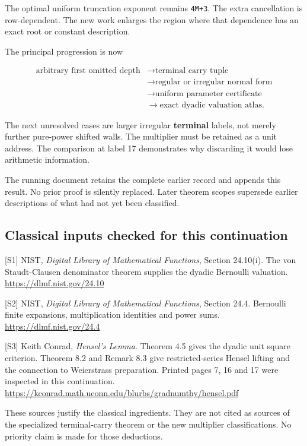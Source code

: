 \documentclass[11pt,letterpaper]{article}
\begin{document}
The optimal uniform truncation exponent remains \texttt{4M+3}. The extra cancellation is row-dependent. The new work enlarges the region where that dependence has an exact root or constant description.

The principal progression is now

\[
\begin{aligned}
\text{arbitrary first omitted depth}
&\longrightarrow\text{terminal carry tuple}\\
&\longrightarrow\text{regular or irregular normal form}\\
&\longrightarrow\text{uniform parameter certificate}\\
&\longrightarrow\text{exact dyadic valuation atlas}.
\end{aligned}
\]

The next unresolved cases are larger irregular \textbf{terminal} labels, not merely further pure-power shifted walls. The multiplier must be retained as a unit address. The comparison at label 17 demonstrates why discarding it would lose arithmetic information.

The running document retains the complete earlier record and appends this result. No prior proof is silently replaced. Later theorem scopes supersede earlier descriptions of what had not yet been classified.

\clearpage

\subsection{Classical inputs checked for this continuation}\label{classical-inputs-checked-for-this-continuation}

{[}S1{]} NIST, \emph{Digital Library of Mathematical Functions}, Section 24.10(i). The von Staudt-Clausen denominator theorem supplies the dyadic Bernoulli valuation. \url{https://dlmf.nist.gov/24.10}

{[}S2{]} NIST, \emph{Digital Library of Mathematical Functions}, Section 24.4. Bernoulli finite expansions, multiplication identities and power sums. \url{https://dlmf.nist.gov/24.4}

{[}S3{]} Keith Conrad, \emph{Hensel's Lemma}. Theorem 4.5 gives the dyadic unit square criterion. Theorem 8.2 and Remark 8.3 give restricted-series Hensel lifting and the connection to Weierstrass preparation. Printed pages 7, 16 and 17 were inspected in this continuation. \url{https://kconrad.math.uconn.edu/blurbs/gradnumthy/hensel.pdf}

These sources justify the classical ingredients. They are not cited as sources of the specialized terminal-carry theorem or the new multiplier classifications. No priority claim is made for those deductions.
\end{document}
